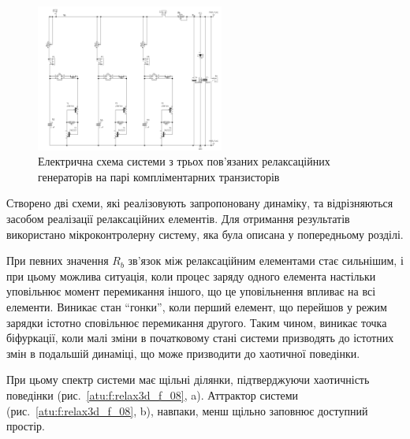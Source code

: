 \documentclass[a4paper,13pt]{atuaref}
\begin{document}

\begin{figure}[htb!]
  \centerline{\includegraphics[width=0.55\textwidth]{p7/p/relax3d_schem.png} }
  \caption{Електрична схема системи з трьох пов'язаних релаксаційних генераторів на парі компліментарних транзисторів}
  \label{atu:f:relax3d_schem}
\end{figure}


Створено дві схеми,
які реалізовують запропоновану динаміку, та відрізняються
засобом реалізації релаксаційних елементів.
Для отримання результатів використано мікроконтролерну систему,
яка була описана у попередньому розділі.

При певних значення $R_b$ зв'язок між релаксаційним елементами стає сильнішим,
і при цьому можлива ситуація, коли
процес заряду одного елемента настільки уповільнює момент перемикання іншого,
що це уповільнення впливає на всі елементи. Виникає стан ``гонки'', коли
перший елемент, що перейшов у режим зарядки істотно сповільнює перемикання другого. Таким
чином, виникає точка біфуркації, коли малі зміни в початковому стані системи
призводять до істотних змін в подальшій динаміці, що може призводити до
хаотичної поведінки.

При цьому спектр системи має щільні ділянки, підтверджуючи хаотичність
поведінки (рис.~\ref{atu:f:relax3d_f_08}, a). Аттрактор системи
(рис.~\ref{atu:f:relax3d_f_08}, b), навпаки, менш щільно заповнює
доступний простір.
\end{document}
